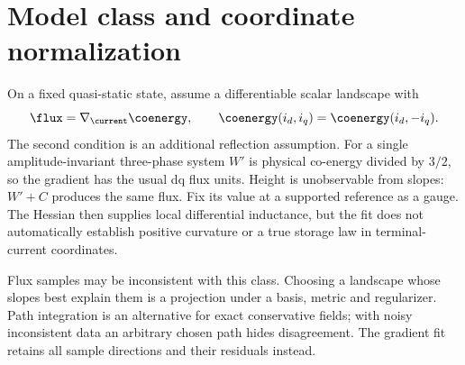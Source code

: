 \section{Model class and coordinate normalization}
\label{sec:potential}
On a fixed quasi-static state, assume a differentiable scalar landscape with
\begin{equation}
 \flux=\nabla_{\current}\coenergy,\qquad
 \coenergy(i_d,i_q)=\coenergy(i_d,-i_q).
 \label{eq:potential-gradient}
\end{equation}
The second condition is an additional reflection assumption. For a single
amplitude-invariant three-phase system $W'$ is physical co-energy divided by
$3/2$, so the gradient has the usual dq flux units.
Height is unobservable from slopes: $W'+C$ produces the same flux. Fix its
value at a supported reference as a gauge. The Hessian then supplies local
differential inductance, but the fit does not automatically establish
positive curvature or a true storage law in terminal-current coordinates.

Flux samples may be inconsistent with this class. Choosing a landscape whose
slopes best explain them is a projection under a basis, metric and regularizer.
Path integration is an alternative for exact conservative fields; with noisy
inconsistent data an arbitrary chosen path hides disagreement. The gradient
fit retains all sample directions and their residuals instead.
